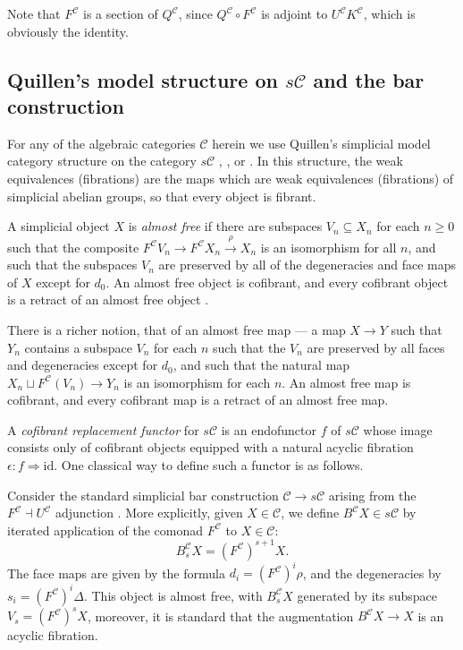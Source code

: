 \documentclass[11pt]{amsart} \renewcommand{\baselinestretch}{1.2}
\theoremstyle{plain}
\theoremstyle{definition}
\renewcommand{\to}{\longrightarrow}
\newcommand{\calc}{\mathcal{C}}
\newcommand{\citeBOX}[2][]{\cite[\mbox{#1}]{#2}}
\newcommand{\Id}{\mathrm{id}}
\begin{document}
\begin{Conventions and notation}
Note that $F^\calc$ is a section of $Q^{\calc}$, since $Q^{\calc}\circ F^{\calc}$ is adjoint to $U^\calc K^\calc$, which is obviously the identity.

\subsection{Quillen's model structure on $s\calc$ and the bar construction}\label{ssec: quillen model and bar construction}
For any of the algebraic categories $\calc$ herein we use Quillen's simplicial model category structure on the category $s\calc$ \cite{QuillenHomAlg.pdf}, \cite{MillerSullivanConjecture.pdf}, or \cite{Blanc_Stover-Groth_SS.pdf}. In this structure, the weak equivalences (fibrations) are the maps which are weak equivalences (fibrations) of simplicial abelian groups, so that every object is fibrant. 

 A simplicial object $X$ is \emph{almost free} if there are subspaces $V_n\subseteq X_n$ for each $n\geq0$ such that the composite $F^\calc  V_n\to F^\calc  X_n\overset{\rho}{\to} X_n$ is an isomorphism for all $n$, and such that the subspaces $V_n$ are preserved by all of the degeneracies and face maps of $X$ except for $d_0$. An almost free object is cofibrant, and every cofibrant object is a retract of an almost free object \citeBOX[\S3]{MillerSullivanConjecture.pdf}. 

There is a richer notion, that of an almost free map --- a map $X\to Y$ such that $Y_n$ contains a subspace $V_n$ for each $n$ such that the $V_n$ are preserved by all faces and degeneracies except for $d_0$, and such that the natural map $X_n\sqcup F^\calc(V_n) \to Y_n$ is an isomorphism for each $n$. An almost free map is cofibrant, and every cofibrant map is a retract of an almost free map.

A \emph{cofibrant replacement functor} for $s\calc$  is an endofunctor $f$ of $s\calc$ whose image consists only of cofibrant objects equipped with  a natural acyclic fibration $\epsilon:f\Rightarrow \Id $. One classical way to define such a functor is as follows.

Consider the standard simplicial bar construction $\calc\to s\calc$ arising from the $F^\calc\dashv U^\calc$ adjunction \cite{BlumRiehlResolutions.pdf}. More explicitly, given $X\in\calc$, we define $B^\calc X\in s\calc$ by iterated application of the comonad $F^\calc$ to $X\in \calc$:
\[B_s^\calc X=(F^\calc)^{s+1}X.\]
The face maps are given by the formula $d_i=(F^\calc)^i\rho$, and the degeneracies by $s_i=(F^\calc)^i\Delta$. %
This object is almost free, with $B_s^\calc X$ generated by its subspace $V_s=(F^\calc )^sX$, moreover, it is standard \citeBOX[\S4]{BlumRiehlResolutions.pdf} that the augmentation $B^\calc X\to X$ is an acyclic fibration.


\end{Conventions and notation}
\end{document}
